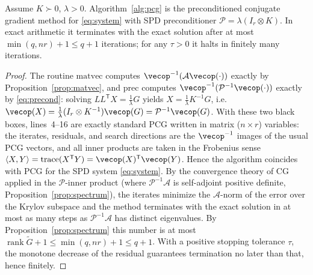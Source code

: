 \begin{theorem}\label{thm:pcg}
Assume $K\succ0$, $\lambda>0$. Algorithm~\ref{alg:pcg} is the preconditioned conjugate
gradient method for \eqref{eq:system} with SPD preconditioner $\mathcal P=\lambda
(I_r\otimes K)$. In exact arithmetic it terminates with the exact solution after at
most $\min(q,nr)+1\le q+1$ iterations; for any $\tau>0$ it halts in finitely many
iterations.
\end{theorem}
\begin{proof}
The routine $\mathrm{matvec}$ computes $\vecop^{-1}(\mathcal A\vecop(\cdot))$ exactly by
Proposition~\ref{prop:matvec}, and $\mathrm{prec}$ computes
$\vecop^{-1}(\mathcal P^{-1}\vecop(\cdot))$ exactly by \eqref{eq:precond}: solving
$LL^{\mathsf T}X=\tfrac1\lambda G$ yields $X=\tfrac1\lambda K^{-1}G$, i.e.\
$\vecop(X)=\tfrac1\lambda(I_r\otimes K^{-1})\vecop(G)=\mathcal P^{-1}\vecop(G)$. With
these two black boxes, lines~4--16 are exactly standard PCG written in matrix
($n\times r$) variables: the iterates, residuals, and search directions are the
$\vecop^{-1}$ images of the usual PCG vectors, and all inner products are taken in the
Frobenius sense $\langle X,Y\rangle=\operatorname{trace}(X^{\mathsf T}Y)
=\vecop(X)^{\mathsf T}\vecop(Y)$. Hence the algorithm coincides with PCG for the SPD
system \eqref{eq:system}. By the convergence theory of CG applied in the
$\mathcal P$-inner product (where $\mathcal P^{-1}\mathcal A$ is self-adjoint positive
definite, Proposition~\ref{prop:spectrum}), the iterates minimize the
$\mathcal A$-norm of the error over the Krylov subspace and the method terminates with
the exact solution in at most as many steps as $\mathcal P^{-1}\mathcal A$ has distinct
eigenvalues. By Proposition~\ref{prop:spectrum} this number is at most
$\operatorname{rank}\tilde G+1\le\min(q,nr)+1\le q+1$. With a positive stopping
tolerance $\tau$, the monotone decrease of the residual guarantees termination no later
than that, hence finitely.
\end{proof}

